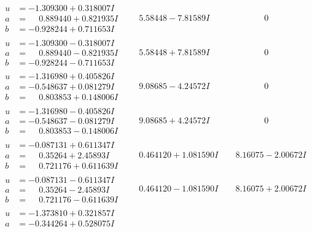 \documentclass[1p]{elsarticle_modified}
\theoremstyle{definition}
\begin{document}
$$\begin{array}{c|c|c}
\begin{aligned}
u &= -1.309300 + 0.318007 I \\
a &= \phantom{-}0.889440 + 0.821935 I \\
b &= -0.928244 + 0.711653 I\end{aligned}
 & \phantom{-}5.58448 - 7.81589 I & \phantom{-0.000000 } 0 \\ \hline\begin{aligned}
u &= -1.309300 - 0.318007 I \\
a &= \phantom{-}0.889440 - 0.821935 I \\
b &= -0.928244 - 0.711653 I\end{aligned}
 & \phantom{-}5.58448 + 7.81589 I & \phantom{-0.000000 } 0 \\ \hline\begin{aligned}
u &= -1.316980 + 0.405826 I \\
a &= -0.548637 + 0.081279 I \\
b &= \phantom{-}0.803853 + 0.148006 I\end{aligned}
 & \phantom{-}9.08685 - 4.24572 I & \phantom{-0.000000 } 0 \\ \hline\begin{aligned}
u &= -1.316980 - 0.405826 I \\
a &= -0.548637 - 0.081279 I \\
b &= \phantom{-}0.803853 - 0.148006 I\end{aligned}
 & \phantom{-}9.08685 + 4.24572 I & \phantom{-0.000000 } 0 \\ \hline\begin{aligned}
u &= -0.087131 + 0.611347 I \\
a &= \phantom{-}0.35264 + 2.45893 I \\
b &= \phantom{-}0.721176 + 0.611639 I\end{aligned}
 & \phantom{-}0.464120 + 1.081590 I & \phantom{-}8.16075 - 2.00672 I \\ \hline\begin{aligned}
u &= -0.087131 - 0.611347 I \\
a &= \phantom{-}0.35264 - 2.45893 I \\
b &= \phantom{-}0.721176 - 0.611639 I\end{aligned}
 & \phantom{-}0.464120 - 1.081590 I & \phantom{-}8.16075 + 2.00672 I \\ \hline\begin{aligned}
u &= -1.373810 + 0.321857 I \\
a &= -0.344264 + 0.528075 I \\

\end{aligned}
\end{array}$$
\end{document}
